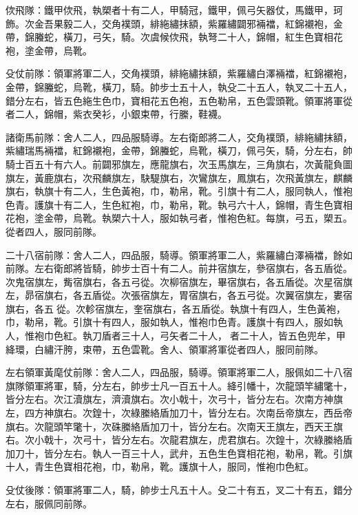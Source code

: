\begin{pinyinscope}
 佽飛隊：鐵甲佽飛，執槊者十有二人，甲騎冠，鐵甲，佩弓矢器仗，馬鐵甲，珂飾。次金吾果毅二人，交角襆頭，緋絁繡抹額，紫羅繡闢邪裲襠，紅錦襯袍，金帶，錦螣蛇，橫刀，弓矢，騎。次虞候佽飛，執弩二十人，錦帽，紅生色寶相花袍，塗金帶，烏靴。



 殳仗前隊：領軍將軍二人，交角襆頭，緋絁繡抹額，紫羅繡白澤裲襠，紅錦襯袍，金帶，錦螣蛇，烏靴，橫刀，騎。帥步士五十人，執殳二十五人，執叉二十五人，錯分左右，皆五色絁生色巾，寶相花五色袍，五色勒帛，五色雲頭靴。領軍將軍從者二人，錦帽，紫衣癸衫，小銀束帶，行縢，鞋襪。



 諸衛馬前隊：舍人二人，四品服騎導。左右衛郎將二人，交角襆頭，緋絁繡抹額，紫繡瑞馬裲襠，紅錦襯袍，金帶，錦螣蛇，烏靴，橫刀，佩弓矢，騎，分左右，帥騎士百五十有六人。前闢邪旗左，應龍旗右，次玉馬旗左，三角旗右，次黃龍負圖旗左，黃鹿旗右，次飛麟旗左，駃騠旗右，次鸞旗左，鳳旗右，次飛黃旗左，麒麟旗右，執旗十有二人，生色黃袍，巾，勒帛，靴。引旗十有二人，服同執人，惟袍色青。護旗十有二人，生色紅袍，巾，勒帛，靴。執弓六十人，錦帽，青生色寶相花袍，塗金帶，烏靴。執槊六十人，服如執弓者，惟袍色紅。每旗，弓五，槊五。從者四人，服同前隊。



 二十八宿前隊：舍人二人，四品服，騎導。領軍將軍二人，紫羅繡白澤裲襠，餘如前隊。左右衛郎將皆騎，帥步士百十有二人。前井宿旗左，參宿旗右，各五盾從。次鬼宿旗左，觜宿旗右，各五弓從。次柳宿旗左，畢宿旗右，各五盾從。次星宿旗左，昴宿旗右，各五盾從。次張宿旗左，胃宿旗右，各五弓從。次翼宿旗左，婁宿旗右，各五從。次軫宿旗左，奎宿旗右，各五盾從。執旗十有四人，生色黃袍，巾，勒帛，靴。引旗十有四人，服如執人，惟袍巾色青。護旗十有四人，服如執人，惟袍巾色紅。執刀盾者三十人，弓矢者二十人，者二十人，皆五色兜牟，甲絳環，白繡汗胯，束帶，五色雲靴。舍人、領軍將軍從者四人，服同前隊。



 左右領軍黃麾仗前隊：舍人二人，四品服，騎導。領軍將軍二人，服佩如二十八宿旗隊領軍將軍，騎，分左右，帥步士凡一百五十人。絳引幡十，次龍頭竿繡氅十，皆分左右。次江瀆旗左，濟瀆旗右。次小戟十，次弓十，皆分左右。次南方神旗左，四方神旗右。次鍠十，次綠縢絡盾加刀十，皆分左右。次南岳帝旗左，西岳帝旗右。次龍頭竿氅十，次硃縢絡盾加刀十，皆分左右。次南天王旗左，西天王旗右。次小戟十，次弓十，皆分左右。次龍君旗左，虎君旗右。次鍠十，次綠縢絡盾加刀十，皆分左右。執人一百三十人，武弁，五色生色寶相花袍，勒帛，靴。引旗十人，青生色寶相花袍，巾，勒帛，靴。護旗十人，服同，惟袍巾色紅。



 殳仗後隊：領軍將軍二人，騎，帥步士凡五十人。殳二十有五，叉二十有五，錯分左右，服佩同前隊。




\end{pinyinscope}
